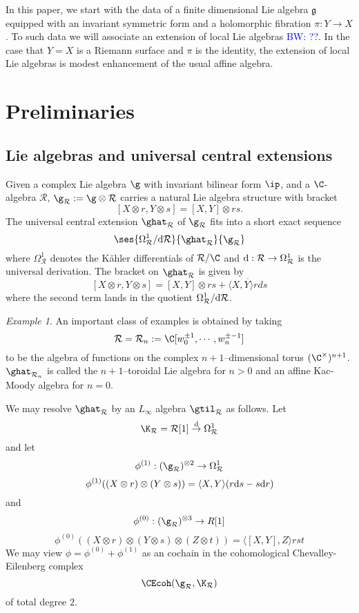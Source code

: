 \documentclass[12pt]{amsart}
\theoremstyle{definition}
\theoremstyle{remark}
\newtheorem{eg}[thm]{Example}
\newcommand{\R}{\mathcal{R}}
\def\d{{\rm d}}
\def\fg{\mathfrak{g}}
\def\brian{\textcolor{blue}{BW: }\textcolor{blue}}
\begin{document}
In this paper, we start with the data of a finite dimensional Lie algebra $\fg$ equipped with an invariant symmetric form and a holomorphic fibration $\pi : Y \to X$. 
To such data we will associate an extension of local Lie algebras \brian{??}.
In the case that $Y = X$ is a Riemann surface and $\pi$ is the identity, the extension of local Lie algebras is modest enhancement of the usual affine algebra.


\section{Preliminaries}
\subsection{Lie algebras and universal central extensions}



Given a complex Lie algebra $\g$ with invariant bilinear form $\ip$, and a $\C$-algebra $\R$, $ \g_{\R} := \g \otimes \R$ carries a natural Lie algebra structure with bracket
\[
[X \otimes r, Y \otimes s] = [X,Y] \otimes rs.
\]
The universal central extension $\ghat_{\R}$ of $\g_{\R}$ fits into a short exact sequence
\[
\ses{\Omega^1_{\R} / \d \R}{\ghat_{\R}}{\g_{\R}}
\]
where $\Omega^1_{\R}$ denotes the K\"{a}hler differentials of $\R/\C$ and $\d: \R \rightarrow \Omega^{1}_{\R}$ is the universal derivation. The bracket on $\ghat_{\R}$ is given by 
\[
[X \otimes r, Y \otimes s] =  [X,Y] \otimes rs + \overline{\langle X, Y \rangle r ds}
\]
where the second term lands in the quotient $\Omega^1_{\R} / \d \R$. 

\begin{eg}

An important class of examples is obtained by taking
\[
\R= \R_n := \C[w^{\pm 1}_0, \cdots, w^{\pm -1}_n]
\]
to be the algebra of functions on the complex $n+1$--dimensional torus $(\C^{\times})^{n+1}$. $\ghat_{\R_n}$ is called the $n+1$--toroidal Lie algebra for $n >0$ and an affine Kac-Moody algebra for $n=0$. 

\end{eg}

We may resolve $\ghat_{\R}$ by an $L_{\infty}$ algebra $\gtil_{\R}$ as follows. Let 
\[
\K_{\R} = \R[1] \overset{\d}{\rightarrow} \Omega^{1}_{\R}
\]
and let
$$ \phi^{(1)}: (\g_{\R})^{\otimes 2} \rightarrow \Omega^1_{\R} $$
$$ \phi^{(1)} ((X \otimes r) \otimes (Y \otimes s)) = \langle X, Y \rangle (r \d s - s \d r) $$
and 
$$ \phi^{(0)}: (\g_{\R})^{\otimes 3} \rightarrow R[1] $$
$$ \phi^{(0)}( (X \otimes r)\otimes(Y \otimes s) \otimes (Z \otimes t)) = \langle [X,Y], Z \rangle rst $$
We may view $\phi = \phi^{(0)} + \phi^{(1)}$ as an cochain in the cohomological Chevalley-Eilenberg complex $$ \CEcoh(\g_{\R}, \K_{\R}) $$ of total degree $2$.
\end{document}
